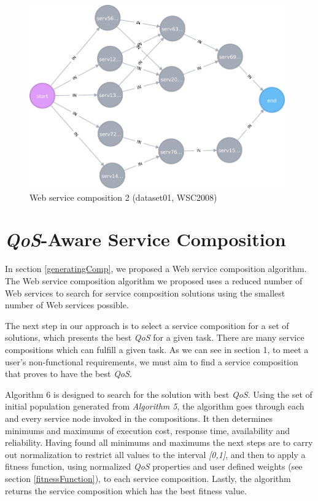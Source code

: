 \begin{figure}[h]
\includegraphics[width=11cm]{svg-composition2.pdf}
\centering
\caption{Web service composition 2 (dataset01, WSC2008)}
\label{fig:compEg2} 
\end{figure} 

\section{\emph{QoS}-Aware Service Composition}

In section \ref{generatingComp}, we proposed a Web service composition algorithm. The Web service composition algorithm we proposed uses a reduced number of Web services to search for service composition solutions using the smallest number of Web services possible.\par

The next step in our approach is to select a service composition for a set of solutions, which presents the best \emph{QoS} for a given task. There are many service compositions which can fulfill a given task. As we can see in section 1, to meet a user's non-functional requirements, we must aim to find a service composition that proves to have the best \emph{QoS}.\par

Algorithm 6 is designed to search for the solution with best \emph{QoS}. Using the set of initial population generated from \emph{Algorithm 5}, the algorithm goes through each and every service node invoked in the compositions. It then determines minimums and maximums of execution cost, response time, availability and reliability. Having found all minimums and maximums the next steps are to carry out normalization to restrict all values to the interval \emph{[0,1]}, and then to apply a fitness function, using normalized \emph{QoS} properties and user defined weights (see section \ref{fitnessFunction}), to each service composition. Lastly, the algorithm returns the service composition which has the best fitness value. \par

